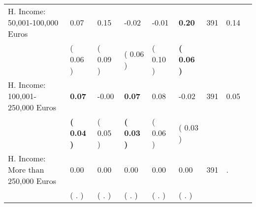 \begin{tabular}{L{6.2cm} C{1.8cm} C{1.8cm} C{1.8cm} C{1.8cm} C{1.8cm} C{1.8cm} C{0.3cm} C{0.3cm}}
H. Income: 50,001-100,000 Euros &      0.07 &      0.15 &     -0.02 &     -0.01 & \textbf{     0.20}  & 391 &       0.14 \\ 
 & (     0.06 ) & (     0.09 ) & (     0.06 ) & (     0.10 ) & \textbf{(     0.06 )}  & \\
H. Income: 100,001-250,000 Euros & \textbf{     0.07} &     -0.00 & \textbf{     0.07} &      0.08 &     -0.02  & 391 &       0.05 \\ 
 & \textbf{(     0.04 )} & (     0.05 ) & \textbf{(     0.03 )} & (     0.06 ) & (     0.03 )  & \\
H. Income: More than 250,000 Euros &      0.00 &      0.00 &      0.00 &      0.00 &      0.00  & 391 &          . \\ 
 & (        . ) & (        . ) & (        . ) & (        . ) & (        . )  & \\
\bottomrule
\end{tabular}
